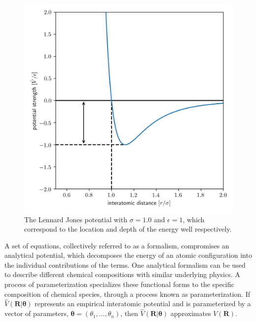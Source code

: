 \begin{figure}[h]
  \centering
    \includegraphics[width=5in]{chapter3/lj}
    \caption[The Lennard Jones Potential]{The Lennard Jones potential with $\sigma=1.0$ and $\epsilon=1$, which correspond to the location and depth of the energy well respectively.}
		\label{fig:lj_potential}
\end{figure}

A set of equations, collectively referred to as a formalism, compromises an analytical potential, which decomposes the energy of an atomic configuration into the individual contributions of the terms.
One analytical formalism can be used to describe different chemical compositions with similar underlying physics.  A process of parameterization specializes these functional forms to the specific composition of chemical species, through a process known as parameterization.
If $\hat{V}(\bm{R}|\bm{\theta})$ represents an empirical interatomic potential and is parameterized by a vector of parameters, $\bm{\theta}=(\theta_1,...,\theta_n)$, then $\hat{V}(\bm{R}|\bm{\theta})$ approximates $V(\bm{R})$.

